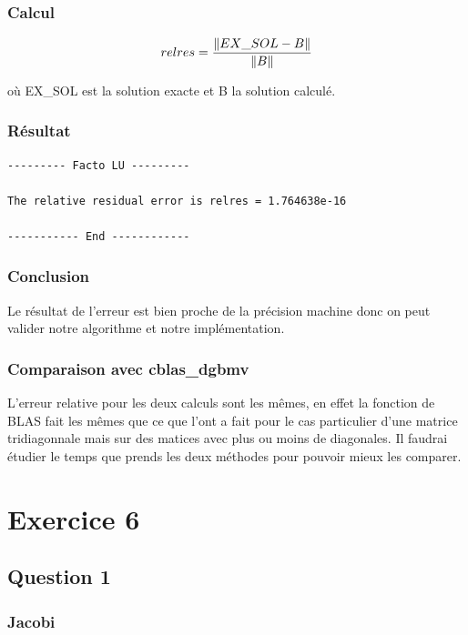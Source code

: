 \documentclass[11pt]{article}
\DeclarePairedDelimiter{\norm}{\lVert}{\rVert}
\begin{document}
\subsubsection{Calcul}

\begin{equation*}
relres = \frac{\norm{EX\_SOL - B}}{\norm{B}}
\end{equation*}

où EX\_SOL est la solution exacte et B la solution calculé.

\subsubsection{Résultat}

\begin{lstlisting}
--------- Facto LU ---------

The relative residual error is relres = 1.764638e-16

----------- End ------------
\end{lstlisting}

\subsubsection{Conclusion}

Le résultat de l'erreur est bien proche de la précision machine donc
on peut valider notre algorithme et notre implémentation.

\subsubsection{Comparaison avec cblas\_dgbmv}

L'erreur relative pour les deux calculs sont les mêmes, en effet la
fonction de BLAS fait les mêmes que ce que l'ont a fait pour le
cas particulier d'une matrice tridiagonnale mais sur des matices avec
plus ou moins de diagonales. Il faudrai étudier le temps que prends les
deux méthodes pour pouvoir mieux les comparer.

\section{Exercice 6}

\subsection{Question 1}

\subsubsection{Jacobi}
\end{document}
